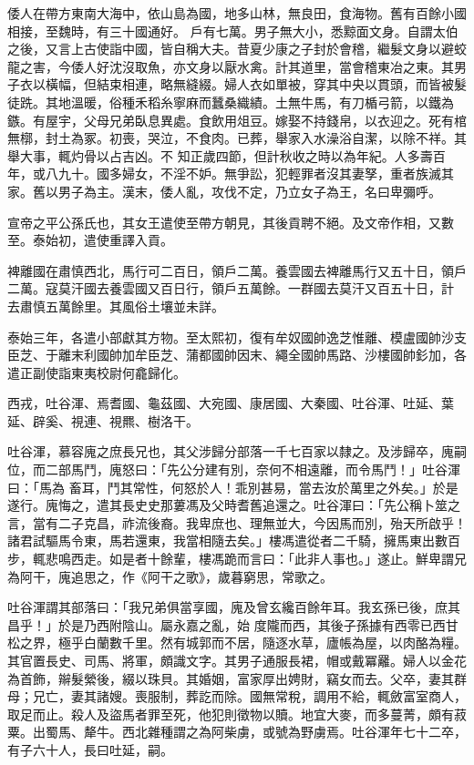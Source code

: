 \begin{pinyinscope}
 倭人在帶方東南大海中，依山島為國，地多山林，無良田，食海物。舊有百餘小國相接，至魏時，有三十國通好。
 戶有七萬。男子無大小，悉黥面文身。自謂太伯之後，又言上古使詣中國，皆自稱大夫。昔夏少康之子封於會稽，繼髮文身以避蛟龍之害，今倭人好沈沒取魚，亦文身以厭水禽。計其道里，當會稽東冶之東。其男子衣以橫幅，但結束相連，略無縫綴。婦人衣如單被，穿其中央以貫頭，而皆被髮徒跣。其地溫暖，俗種禾稻糸寧麻而蠶桑織績。土無牛馬，有刀楯弓箭，以鐵為鏃。有屋宇，父母兄弟臥息異處。食飲用俎豆。嫁娶不持錢帛，以衣迎之。死有棺無槨，封土為冢。初喪，哭泣，不食肉。已葬，舉家入水澡浴自潔，以除不祥。其舉大事，輒灼骨以占吉凶。不
 知正歲四節，但計秋收之時以為年紀。人多壽百年，或八九十。國多婦女，不淫不妒。無爭訟，犯輕罪者沒其妻孥，重者族滅其家。舊以男子為主。漢末，倭人亂，攻伐不定，乃立女子為王，名曰卑彌呼。



 宣帝之平公孫氏也，其女王遣使至帶方朝見，其後貢聘不絕。及文帝作相，又數至。泰始初，遣使重譯入貢。



 裨離國在肅慎西北，馬行可二百日，領戶二萬。養雲國去裨離馬行又五十日，領戶二萬。寇莫汗國去養雲國又百日行，領戶五萬餘。一群國去莫汗又百五十日，計
 去肅慎五萬餘里。其風俗土壤並未詳。



 泰始三年，各遣小部獻其方物。至太熙初，復有牟奴國帥逸芝惟離、模盧國帥沙支臣芝、于離末利國帥加牟臣芝、蒲都國帥因末、繩全國帥馬路、沙樓國帥釤加，各遣正副使詣東夷校尉何龕歸化。



 西戎，吐谷渾、焉耆國、龜茲國、大宛國、康居國、大秦國、吐谷渾、吐延、葉延、辟奚、視連、視羆、樹洛干。



 吐谷渾，慕容廆之庶長兄也，其父涉歸分部落一千七百家以隸之。及涉歸卒，廆嗣位，而二部馬鬥，廆怒曰：「先公分建有別，奈何不相遠離，而令馬鬥！」吐谷渾曰：「馬為
 畜耳，鬥其常性，何怒於人！乖別甚易，當去汝於萬里之外矣。」於是遂行。廆悔之，遣其長史史那蔞馮及父時耆舊追還之。吐谷渾曰：「先公稱卜筮之言，當有二子克昌，祚流後裔。我卑庶也、理無並大，今因馬而別，殆天所啟乎！諸君試驅馬令東，馬若還東，我當相隨去矣。」樓馮遣從者二千騎，擁馬東出數百步，輒悲鳴西走。如是者十餘輩，樓馮跪而言曰：「此非人事也。」遂止。鮮卑謂兄為阿干，廆追思之，作《阿干之歌》，歲暮窮思，常歌之。



 吐谷渾謂其部落曰：「我兄弟俱當享國，廆及曾玄纔百餘年耳。我玄孫已後，庶其昌乎！」於是乃西附陰山。屬永嘉之亂，始
 度隴而西，其後子孫據有西零已西甘松之界，極乎白蘭數千里。然有城郭而不居，隨逐水草，廬帳為屋，以肉酪為糧。其官置長史、司馬、將軍，頗識文字。其男子通服長裙，帽或戴冪䍦。婦人以金花為首飾，辮髮縈後，綴以珠貝。其婚姻，富家厚出娉財，竊女而去。父卒，妻其群母；兄亡，妻其諸嫂。喪服制，葬訖而除。國無常稅，調用不給，輒斂富室商人，取足而止。殺人及盜馬者罪至死，他犯則徵物以贖。地宜大麥，而多蔓菁，頗有菽粟。出蜀馬、犛牛。西北雜種謂之為阿柴虜，或號為野虜焉。吐谷渾年七十二卒，有子六十人，長曰吐延，嗣。




\end{pinyinscope}

